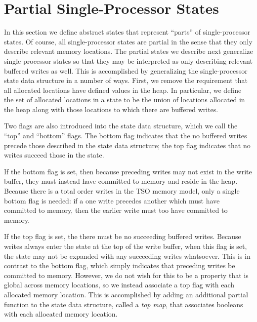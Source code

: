 \documentclass[11pt]{report}
\begin{document}
\section{Partial Single-Processor States} %
\label{sec:partial_states}

In this section we define abstract states that represent ``parts'' of single-processor states. Of course, all single-processor states are partial in the sense that they only describe relevant memory locations. The partial states we describe next generalize single-processor states so that they may be interpreted as only describing relevant buffered writes as well. This is accomplished by generalizing the single-processor state data structure in a number of ways. First, we remove the requirement that all allocated locations have defined values in the heap. In particular, we define the set of allocated locations in a state to be the union of locations allocated in the heap along with those locations to which there are buffered writes.  

Two flags are also introduced into the state data structure, which we call the ``top'' and ``bottom'' flags. The bottom flag indicates that the no buffered writes precede those described in the state data structure; the top flag indicates that no writes succeed those in the state. 

If the bottom flag is set, then because preceding writes may not exist in the write buffer, they must instead have committed to memory and reside in the heap. Because there is a total order writes in the TSO memory model, only a single bottom flag is needed: if a one write precedes another which must have committed to memory, then the earlier write must too have committed to memory. 

If the top flag is set, the there must be no succeeding buffered writes. Because writes always enter the state at the top of the write buffer, when this flag is set, the state may not be expanded with any succeeding writes whatsoever. This is in contrast to the bottom flag, which simply indicates that preceding writes be committed to memory. However, we do not wish for this to be a property that is global across memory locations, so we instead associate a top flag with each allocated memory location. This is accomplished by adding an additional partial function to the state data structure, called a \emph{top map}, that associates booleans with each allocated memory location. %
\end{document}
